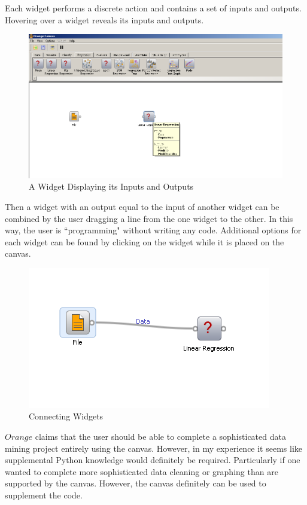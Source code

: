 \begin{flushleft}Each widget performs a discrete action and contains a set of inputs and outputs. Hovering over a widget reveals its inputs and outputs. \end{flushleft}
\begin{figure}[H]
    \centering
       \includegraphics[width=6.5 in]{orange_widget_features.png}
    \caption{A Widget Displaying its Inputs and Outputs}
\end{figure}
Then a widget with an output equal to the input of another widget can be combined by the user dragging a line from the one widget to the other. In this way, the user is ``programming" without writing any code. Additional options for each widget can be found by clicking on the widget while it is placed on the canvas.
\begin{figure}[H]
    \centering
       \includegraphics[width=3.5 in]{orange_connection.PNG}
    \caption{Connecting Widgets}
\end{figure}

\begin{flushleft}$Orange$ claims that the user should be able to complete a sophisticated data mining project entirely using the canvas. However, in my experience it seems like supplemental Python knowledge would definitely be required. Particularly if one wanted to complete more sophisticated data cleaning or graphing than are supported by the canvas. However, the canvas definitely can be used to supplement the code. 
\end{flushleft}




